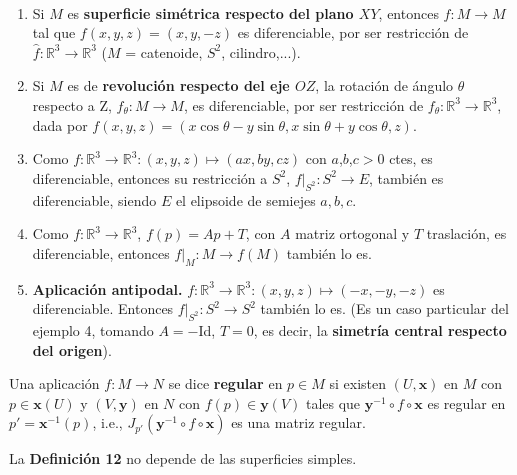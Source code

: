 \documentclass[twoside]{report}
\begin{document}
\begin{ej}

\

\begin{enumerate}
\item
Si $M$ es \textbf{superficie simétrica respecto del plano $XY$}, entonces $f: M \rightarrow M$ tal que $f(x,y,z)=(x,y,-z)$ es diferenciable, por ser restricción de $\widehat{f} : \mathbb{R}^3 \rightarrow \mathbb{R}^3$ ($M$ = catenoide, $S^2$, cilindro,...).

\item Si $M$ es de \textbf{revolución respecto del eje $OZ$}, la rotación de ángulo $\theta$ respecto a Z, $f_{\theta}: M\rightarrow M$, es diferenciable, por ser restricción de $f_{\theta}: \mathbb{R}^3 \rightarrow \mathbb{R}^3$, dada por $f(x,y,z)=(x\cos\theta - y\sin\theta, x\sin\theta+ y\cos\theta,z)$.

\item
Como $f: \mathbb{R}^3 \rightarrow \mathbb{R}^3:(x,y,z)\longmapsto(ax,by,cz)$ con $a$,$b$,$c >0$ ctes, es diferenciable, entonces su restricción a $S^2$, $f\vert_{S^2}: S^2 \rightarrow E$, también es diferenciable, siendo $E$ el elipsoide de semiejes $a,b,c$.

\item
Como $f: \mathbb{R}^3 \rightarrow \mathbb{R}^3$, $f(p)= Ap + T$, con $A$ matriz ortogonal y $T$ traslación, es diferenciable, entonces $f\vert_{M}: M \rightarrow f(M)$ también lo es.

\item \textbf{Aplicación antipodal.}
$f: \mathbb{R}^3 \rightarrow \mathbb{R}^3:(x,y,z) \longmapsto (-x,-y,-z)$ es diferenciable. Entonces $f\vert_{S^2}: S^2 \rightarrow S^2$ también lo es. (Es un caso particular del ejemplo 4, tomando $A= -$Id, $T=0$, es decir, la \textbf{simetría central respecto del origen}).
\end{enumerate}
\end{ej}


\begin{defi}
Una aplicación $f: M\rightarrow N$ se dice \textbf{regular} en $p\in M$ si existen $(U,\textbf{x})$ en $M$ con $p \in \textbf{x}(U)$ y $(V,\textbf{y})$ en $N$ con $f(p) \in \textbf{y}(V)$ tales que $\textbf{y}^{-1}\circ f \circ \textbf{x}$ es regular en $p' = \textbf{x}^{-1}(p)$, i.e., $J_{p'}(\textbf{y}^{-1}\circ f \circ \textbf{x})$ es una matriz regular.
\end{defi}

\begin{nota}
La \textup{\textbf{Definición 12}} no depende de las superficies simples.
\end{nota}
\end{document}
